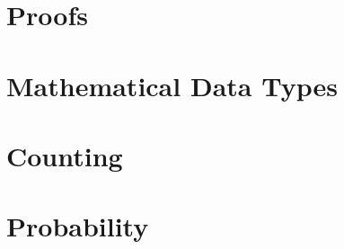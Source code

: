 \documentclass{mcs}
\begin{document}
\frontmatter

%

\mainmatter



\part{Proofs}







\part{Mathematical Data Types}







\part{Counting}





\part{Probability}







\end{document}
